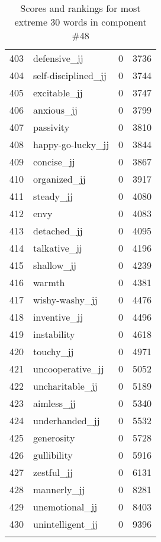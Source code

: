 \begin{longtable}[!htbp]{| rlr@{.}l |}
    403 & defensive\_jj & 0 & 3736 \\
    404 & self-disciplined\_jj & 0 & 3744 \\
    405 & excitable\_jj & 0 & 3747 \\
    406 & anxious\_jj & 0 & 3799 \\
    407 & passivity & 0 & 3810 \\
    408 & happy-go-lucky\_jj & 0 & 3844 \\
    409 & concise\_jj & 0 & 3867 \\
    410 & organized\_jj & 0 & 3917 \\
    411 & steady\_jj & 0 & 4080 \\
    412 & envy & 0 & 4083 \\
    413 & detached\_jj & 0 & 4095 \\
    414 & talkative\_jj & 0 & 4196 \\
    415 & shallow\_jj & 0 & 4239 \\
    416 & warmth & 0 & 4381 \\
    417 & wishy-washy\_jj & 0 & 4476 \\
    418 & inventive\_jj & 0 & 4496 \\
    419 & instability & 0 & 4618 \\
    420 & touchy\_jj & 0 & 4971 \\
    421 & uncooperative\_jj & 0 & 5052 \\
    422 & uncharitable\_jj & 0 & 5189 \\
    423 & aimless\_jj & 0 & 5340 \\
    424 & underhanded\_jj & 0 & 5532 \\
    425 & generosity & 0 & 5728 \\
    426 & gullibility & 0 & 5916 \\
    427 & zestful\_jj & 0 & 6131 \\
    428 & mannerly\_jj & 0 & 8281 \\
    429 & unemotional\_jj & 0 & 8403 \\
    430 & unintelligent\_jj & 0 & 9396 \\
    \hline
    \caption{Scores and rankings for most extreme 30 words in component \#48} \\
\end{longtable}
